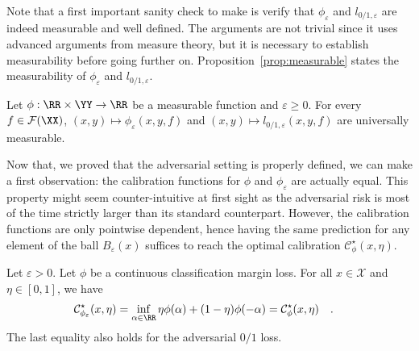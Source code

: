Note that a first important sanity check to make is verify that $\phi_\varepsilon$ and $l_{0/1,\varepsilon}$ are indeed measurable and well defined. The arguments are not trivial since it uses advanced arguments from measure theory, but it is necessary to establish measurability before going further on. Proposition~\ref{prop:measurable} states the measurability of $\phi_\varepsilon$ and $l_{0/1,\varepsilon}$.

\begin{prop}
\label{prop:measurable}
Let  $\phi:\RR\times \YY\to\RR$ be a measurable function and $\varepsilon\geq0$. For every $f\in\mathcal{F}(\XX)$, $(x,y)\mapsto \phi_\varepsilon(x,y,f)$  and $(x,y)\mapsto l_{0/1,\varepsilon}(x,y,f)$ are universally measurable.
\end{prop}

Now that, we proved that the adversarial setting is properly defined, we can make a first observation: the calibration functions for $\phi$ and $\phi_\varepsilon$ are actually equal. This property might seem counter-intuitive at first sight as the adversarial risk is most of the time strictly larger than its standard counterpart. However, the calibration functions are only pointwise dependent, hence having the same prediction for any element of the ball $B_\varepsilon(x)$ suffices to reach the optimal calibration $\mathcal{C}^\star_\phi(x,\eta)$.



\begin{prop}
\label{prop:calib-equality}
Let $\varepsilon>0$. Let $\phi$ be a continuous classification margin loss.  For all $x\in\mathcal{X}$ and $\eta\in[0,1]$, we have
\begin{align*}
    \mathcal{C}^\star_{\phi_\varepsilon}(x,\eta)&= \inf_{\alpha\in\RR}\eta \phi(\alpha)+(1-\eta)\phi(-\alpha)
    =\mathcal{C}^\star_\phi(x,\eta)\quad.
\end{align*}
The last equality also holds for the adversarial $0/1$ loss.
\end{prop}

